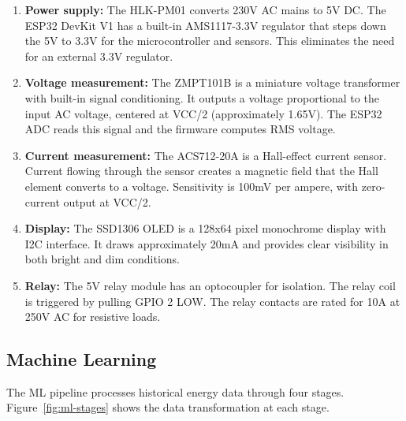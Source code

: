 \documentclass[12pt, a4paper]{article}
\begin{document}
	\begin{enumerate}[]
	\item \textbf{Power supply:} The HLK-PM01 converts 230V AC mains to 5V DC. The ESP32 DevKit V1 has a built-in AMS1117-3.3V regulator that steps down the 5V to 3.3V for the microcontroller and sensors. This eliminates the need for an external 3.3V regulator.
	
	\item \textbf{Voltage measurement:} The ZMPT101B is a miniature voltage transformer with built-in signal conditioning. It outputs a voltage proportional to the input AC voltage, centered at VCC/2 (approximately 1.65V). The ESP32 ADC reads this signal and the firmware computes RMS voltage.
	
	\item \textbf{Current measurement:} The ACS712-20A is a Hall-effect current sensor. Current flowing through the sensor creates a magnetic field that the Hall element converts to a voltage. Sensitivity is 100mV per ampere, with zero-current output at VCC/2.
	
	\item \textbf{Display:} The SSD1306 OLED is a 128x64 pixel monochrome display with I2C interface. It draws approximately 20mA and provides clear visibility in both bright and dim conditions.
	
	\item \textbf{Relay:} The 5V relay module has an optocoupler for isolation. The relay coil is triggered by pulling GPIO 2 LOW. The relay contacts are rated for 10A at 250V AC for resistive loads.
	\end{enumerate}
	
	\subsection{Machine Learning}
	
	The ML pipeline processes historical energy data through four stages. Figure~\ref{fig:ml-stages} shows the data transformation at each stage.
	
\end{document}
